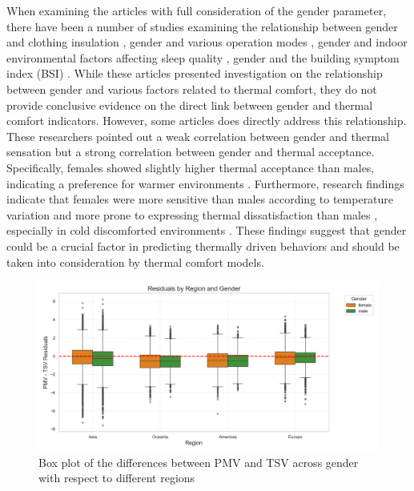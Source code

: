 \documentclass[final,3p,times,12pt]{elsarticle}
\begin{document}
When examining the articles with full consideration of the gender parameter, there have been a number of studies examining the relationship between gender and clothing insulation \cite{tartariniThermalPerceptionsPreferences2018}, gender and various operation modes \cite{vecchiThermalHistoryIts}, gender and indoor environmental factors affecting sleep quality \cite{xuEnvironmentalFactorsAffecting2021}, gender and the building symptom index (BSI) \cite{sekharIndoorAirQuality2003}. 
While these articles presented investigation on the relationship between gender and various factors related to thermal comfort, they do not provide conclusive evidence on the direct link between gender and thermal comfort indicators.
However, some articles does directly address this relationship.
These researchers pointed out a weak correlation between gender and thermal sensation but a strong correlation between gender and thermal acceptance. Specifically, females showed slightly higher thermal acceptance than males, indicating a preference for warmer environments \cite{wangFieldStudyThermal2006}. Furthermore, research findings indicate that females were more sensitive than males according to temperature variation \cite{wangRevisitingIndividualGroup2020a} and more prone to expressing thermal dissatisfaction than males \cite{dedearFieldExperimentsOccupant}, especially in cold discomforted environments \cite{langevinTrackingHumanbuildingInteraction2015}. 
These findings suggest that gender could be a crucial factor in predicting thermally driven behaviors and should be taken into consideration by thermal comfort models.


\begin{figure}[h!]
    \centering
    \includegraphics[width=0.9\linewidth]{reg_gen.png}
    \caption{Box plot of the differences between PMV and TSV across gender with respect to different regions}
    \label{6}
\end{figure}
\end{document}
